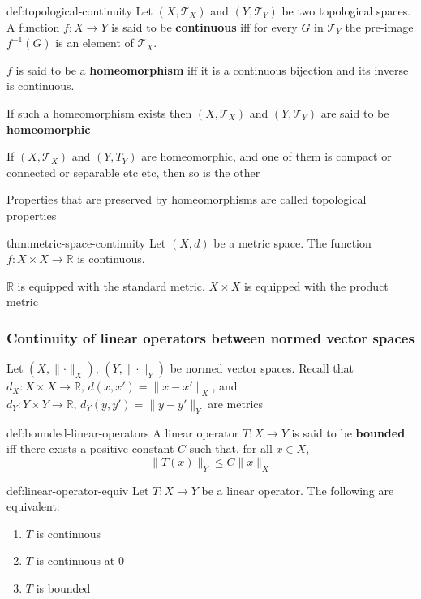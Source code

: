 \documentclass[landscape, 8pt]{extarticle}
\begin{document}
\begin{multicols}{3}
\begin{dfn}{def:topological-continuity}{}
    Let $(X, \mathcal{T}_{X})$ and $(Y, \mathcal{T}_{Y})$ be two topological spaces. A function $f : X \to Y$ is said to be \textbf{continuous} iff for every $G$ in $\mathcal{T}_{Y}$ the pre-image $f^{-1}(G)$ is an element of $\mathcal{T}_{X}$.

    $f$ is said to be a \textbf{homeomorphism} iff it is a continuous bijection and its inverse is continuous.

    If such a homeomorphism exists then $(X, \mathcal{T}_{X})$ and $(Y, \mathcal{T}_{Y})$ are said to be \textbf{homeomorphic}
\end{dfn}

If $(X, \mathcal{T}_{X})$ and $(Y, T_{Y})$ are homeomorphic, and one of them is compact or connected or separable etc etc, then so is the other

Properties that are preserved by homeomorphisms are called topological properties


\begin{thm}{thm:metric-space-continuity}{}
    Let $(X, d)$ be a metric space. The function $f: X \times X \to \mathbb{R} $ is continuous.

    $\mathbb{R}$ is equipped with the standard metric. $X \times X$ is equipped with the product metric
\end{thm}

\subsubsection{Continuity of linear operators between normed vector spaces}
Let $(X, \lVert \cdot \rVert_{X}),\,(Y, \lVert \cdot \rVert_{Y})$ be normed vector spaces. Recall that $d_{X} : X \times X \to \mathbb{R},\,d(x, x') = \lVert x - x' \rVert_{X}$, and $d_{Y} : Y \times Y \to \mathbb{R},\, d_{Y}(y, y') = \lVert  y - y' \rVert_{Y}$ are metrics

\begin{dfn}{def:bounded-linear-operators}{}
    A linear operator $T : X \to Y$ is said to be \textbf{bounded} iff there exists a positive constant $C$ such that, for all $x\in X$,
    \[\lVert T(x) \rVert_{Y} \le C \lVert x \rVert_{X}\]
\end{dfn}

\begin{thm}{def:linear-operator-equiv}{}
    Let $T: X \to Y $ be a linear operator. The following are equivalent:
    \begin{enumerate}
        \item $T$ is continuous
        \item $T$ is continuous at $0$
        \item $T$ is bounded
    \end{enumerate}
\end{thm}


\end{multicols}
\end{document}
